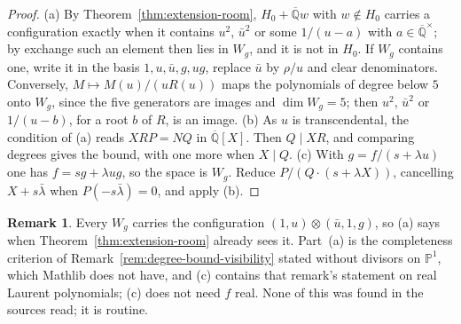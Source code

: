 \documentclass[11pt,a4paper]{article}
\theoremstyle{plain}
\theoremstyle{definition}
\newtheorem{remark}[theorem]{Remark}
\newcommand{\Alg}{\overline{\mathbb{Q}}}
\begin{document}
\begin{proof}
(a) By Theorem~\ref{thm:extension-room}, $H_{0}+\Alg w$ with $w\notin H_{0}$ carries a configuration exactly when it
contains $u^{2}$, $\bar u^{2}$ or some $1/(u-a)$ with $a\in\Alg^{\times}$; by exchange such an element then lies in
$W_{g}$, and it is not in $H_{0}$. If $W_{g}$ contains one, write it in the basis $1,u,\bar u,g,ug$, replace $\bar u$ by
$\rho/u$ and clear denominators. Conversely, $M\mapsto M(u)/(uR(u))$ maps the polynomials of degree below $5$ onto
$W_{g}$, since the five generators are images and $\dim W_{g}=5$; then $u^{2}$, $\bar u^{2}$ or $1/(u-b)$, for a root
$b$ of $R$, is an image.
(b) As $u$ is transcendental, the condition of (a) reads $XRP=NQ$ in $\Alg[X]$. Then $Q\mid XR$, and comparing degrees
gives the bound, with one more when $X\mid Q$.
(c) With $g=f/(s+\lambda u)$ one has $f=sg+\lambda ug$, so the space is $W_{g}$. Reduce $P/(Q\cdot(s+\lambda X))$,
cancelling $X+s\bar\lambda$ when $P(-s\bar\lambda)=0$, and apply (b).
\end{proof}

\begin{remark}\label{rem:degree-one-visibility-credit}
Every $W_{g}$ carries the configuration $(1,u)\otimes(\bar u,1,g)$, so (a) says when Theorem~\ref{thm:extension-room}
already sees it. Part~(a) is the completeness criterion of Remark~\ref{rem:degree-bound-visibility} stated without
divisors on $\mathbb{P}^{1}$, which Mathlib does not have, and (c) contains that remark's statement on real Laurent
polynomials; (c) does not need $f$ real. None of this was found in the sources read; it is routine.
\end{remark}
\end{document}
